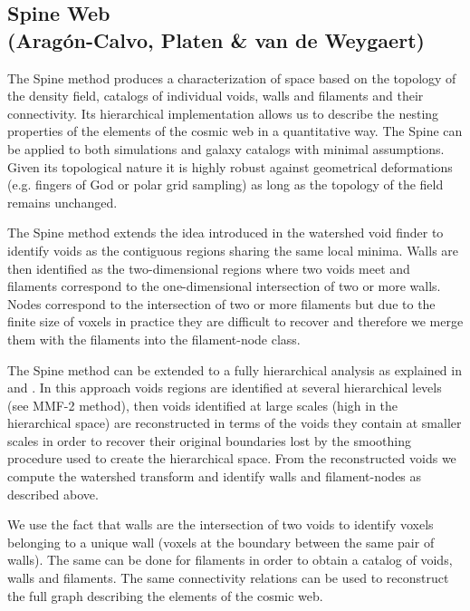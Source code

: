 \subsection{Spine Web \\ \hskip 0.75cm (Arag\'on-Calvo, Platen \& van de Weygaert)}
\label{section:Spine}

The Spine method \citep{aragon2010a} produces a characterization of space based on the topology of the density field, catalogs of individual voids, walls and filaments and their connectivity. Its hierarchical implementation \citep{aragon2010b,aragon2013} allows us to describe the nesting properties of the elements of the cosmic web in a quantitative way. The Spine can be applied to both simulations and galaxy catalogs with minimal assumptions. Given its topological nature it is highly robust against geometrical deformations (e.g. fingers of God or polar grid sampling) as long as the topology of the field remains unchanged.

The Spine method extends the idea introduced in the watershed void finder \citep{platen2007} to identify voids as the contiguous regions sharing the same local minima. Walls are then identified as the two-dimensional regions where two voids meet and filaments correspond to the one-dimensional intersection of two or more walls. Nodes correspond to the intersection of two or more filaments but due to the finite size of voxels in practice they are difficult to recover and therefore we merge them with the filaments into the filament-node class. 

The Spine method can be extended to a fully hierarchical analysis as explained in  \citet{aragon2010b} and \citet{aragon2013}. In this approach voids regions are identified at several hierarchical levels (see MMF-2 method), then voids identified at large scales (high in the hierarchical space) are reconstructed in terms of the voids they contain at smaller scales in order to recover their original boundaries lost by the smoothing procedure used to create the hierarchical space. From the reconstructed voids we compute the watershed transform and identify walls and filament-nodes as described above. 

We use the fact that walls are the intersection of two voids to identify voxels belonging to a unique wall (voxels at the boundary between the same pair of walls). The same can be done for filaments in order to obtain a catalog of voids, walls and filaments. The same connectivity relations can be used to reconstruct the full graph describing the elements of the cosmic web.

